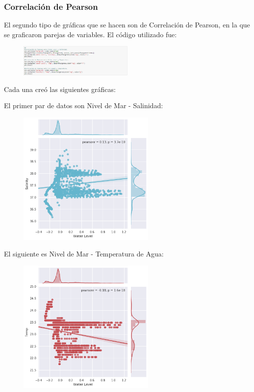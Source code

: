 \documentclass[a4paper]{article}
\begin{document}
\pagebreak
\subsubsection{Correlación de Pearson}
El segundo tipo de gráficas que se hacen son de Correlación de Pearson, en la que se graficaron parejas de variables. El código utilizado fue:
\begin{figure}[ht!]
 \centering
  \includegraphics[width=0.5\textwidth]{PearsonCodigo.PNG}
\end{figure}
Cada una creó las siguientes gráficas:

El primer par de datos son Nivel de Mar - Salinidad:
\begin{figure}[ht!]
 \centering
  \includegraphics[width=0.6\textwidth]{Pearson1.png}
\end{figure}

El siguiente es Nivel de Mar - Temperatura de Agua:
\begin{figure}[ht!]
 \centering
  \includegraphics[width=0.6\textwidth]{Pearson2.png}
\end{figure}
\end{document}
